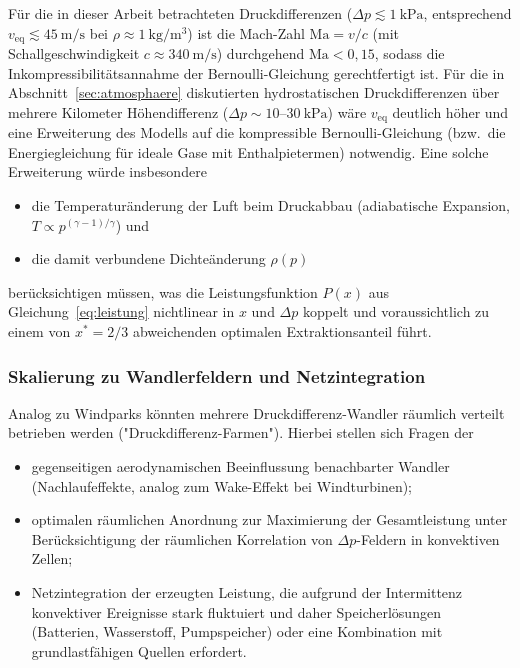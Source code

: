 ﻿\documentclass[a4paper,12pt]{article}
\theoremstyle{definition}
\begin{document}
Für die in dieser Arbeit betrachteten Druckdifferenzen
($\Delta p \lesssim 1\ \mathrm{kPa}$, entsprechend $v_{\mathrm{eq}}
\lesssim 45\ \mathrm{m/s}$ bei $\rho \approx 1\ \mathrm{kg/m^3}$) ist die
Mach-Zahl $\mathrm{Ma} = v/c$ (mit Schallgeschwindigkeit $c \approx 340\
\mathrm{m/s}$) durchgehend $\mathrm{Ma} < 0{,}15$, sodass die
Inkompressibilitätsannahme der Bernoulli-Gleichung gerechtfertigt ist. Für
die in Abschnitt~\ref{sec:atmosphaere} diskutierten hydrostatischen
Druckdifferenzen über mehrere Kilometer Höhendifferenz ($\Delta p \sim
10$--$30\ \mathrm{kPa}$) wäre $v_{\mathrm{eq}}$ deutlich höher und eine
Erweiterung des Modells auf die kompressible Bernoulli-Gleichung (bzw.\
die Energiegleichung für ideale Gase mit Enthalpietermen) notwendig. Eine
solche Erweiterung würde insbesondere
\begin{itemize}
	\item die Temperaturänderung der Luft beim Druckabbau
	(adiabatische Expansion, $T \propto p^{(\gamma-1)/\gamma}$) und
	\item die damit verbundene Dichteänderung $\rho(p)$
\end{itemize}
berücksichtigen müssen, was die Leistungsfunktion $P(x)$ aus
Gleichung~\eqref{eq:leistung} nichtlinear in $x$ und $\Delta p$ koppelt
und voraussichtlich zu einem von $x^\ast = 2/3$ abweichenden optimalen
Extraktionsanteil führt.

\subsubsection{Skalierung zu Wandlerfeldern und Netzintegration}

Analog zu Windparks könnten mehrere Druckdifferenz-Wandler räumlich
verteilt betrieben werden ("Druckdifferenz-Farmen"). Hierbei stellen sich
Fragen der
\begin{itemize}
	\item gegenseitigen aerodynamischen Beeinflussung benachbarter
	Wandler (Nachlaufeffekte, analog zum Wake-Effekt bei Windturbinen);
	\item optimalen räumlichen Anordnung zur Maximierung der
	Gesamtleistung unter Berücksichtigung der räumlichen Korrelation von
	$\Delta p$-Feldern in konvektiven Zellen;
	\item Netzintegration der erzeugten Leistung, die aufgrund der
	Intermittenz konvektiver Ereignisse stark fluktuiert und daher
	Speicherlösungen (Batterien, Wasserstoff, Pumpspeicher) oder eine
	Kombination mit grundlastfähigen Quellen erfordert.
\end{itemize}
\end{document}
